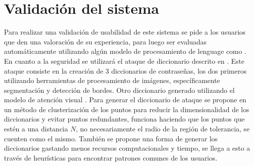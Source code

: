 \section{Validación del sistema}
Para realizar una validaci\'on de usabilidad de este sistema se pide a los usuarios que den una valoraci\'on de su experiencia, para luego ser evaluadas autom\'aticamente utilizando alg\'un modelo de procesamiento de lenguage como \cite{team2023gemini}. En cuanto a la seguridad se utilizar\'a el ataque de diccionario descrito en \cite{van2010purely}. Este ataque consiste en la creaci\'on de 3 diccionarios de contrase\~nas, los dos primeros utilizando herramientas de procesamiento de im\'agenes, espec\'ificamente segmentaci\'on y detecci\'on de bordes. Otro diccionario generado utilizando el modelo de atenci\'on visual \cite{itti2000saliency}. Para generar el diccionario de ataque se propone en  \cite{van2010purely} un m\'etodo de clusterizaci\'on de los puntos para reducir la dimensionalidad de los diccionarios y evitar puntos redundantes, funciona haciendo que los puntos que est\'en a una distancia $N$, no necesariamente el radio de la regi\'on de tolerancia, se cuenten como el mismo. Tambi\'en se propone una forma de generar los diccionarios gastando menos recursos computacionales y tiempo, se llega a esto a trav\'es de heur\'isticas para encontrar patrones comunes de los usuarios. 

